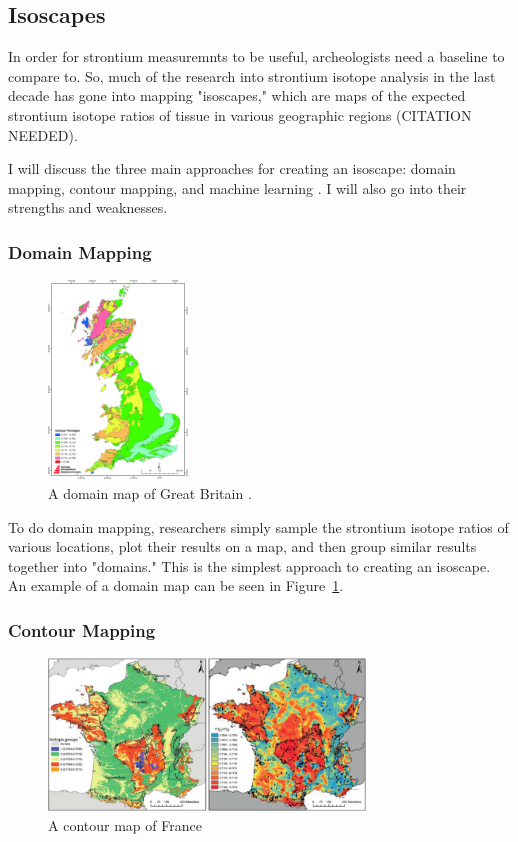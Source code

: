 \documentclass[a4paper, 12pt]{article}
\begin{document}
\subsection{Isoscapes}
In order for strontium measuremnts to be useful, archeologists need a baseline to compare to.
So, much of the research into strontium isotope analysis in the last decade has gone
into mapping "isoscapes," which are maps of the expected strontium isotope ratios
of tissue in various geographic regions (CITATION NEEDED).

I will discuss the three main approaches for creating an isoscape: domain mapping,
contour mapping, and machine learning \citep{holt2021}. I will also go into their
strengths and weaknesses.
\subsubsection{Domain Mapping}
\begin{figure}[htbp]
    \centering
    \includegraphics[width=0.33\textwidth]{domain_mapping.jpg}
    \caption{A domain map of Great Britain \citep{evans2010}.}
    \label{fig:domain_mapping}
\end{figure}
To do domain mapping, researchers simply sample the strontium isotope ratios of
various locations, plot their results on a map, and then group similar results
together into "domains." This is the simplest approach to creating an isoscape.
An example of a domain map can be seen in Figure~\ref{fig:domain_mapping}.

\subsubsection{Contour Mapping}
\begin{figure}[htbp]
    \centering
    \includegraphics[width=0.75\textwidth]{contour_mapping.jpg}
    \caption{A contour map of France \citep{willmes2018}}
    \label{fig:contour_mapping}
\end{figure}
\end{document}
